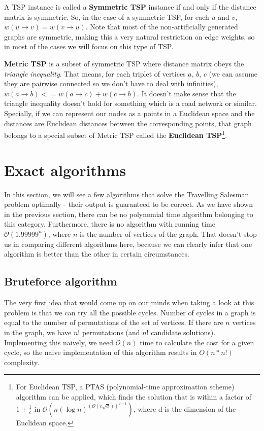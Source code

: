 \documentclass[12pt,twoside,notitlepage]{report}
\begin{document}
\smallskip

A TSP instance is called a {\bf Symmetric TSP} instance if and only if the distance matrix is symmetric. So, in the case of a symmetric TSP, for each $u$ and $v$, $w(u \rightarrow v) = w(v \rightarrow u)$. Note that most of the non-artificially generated graphs are symmetric, making this a very natural restriction on edge weights, so in most of the cases we will focus on this type of TSP. 

{\bf Metric TSP} is a subset of symmetric TSP where distance matrix obeys the {\it triangle inequality}. That means, for each triplet of vertices $a$, $b$, $c$ (we can assume they are pairwise connected so we don't have to deal with infinities), $w(a \rightarrow b) <= w(a \rightarrow c) + w(c \rightarrow b)$. It doesn't make sense that the triangle inequality doesn't hold for something which is a road network or similar. Specially, if we can represent our nodes as a points in a Euclidean space and the distances are Euclidean distances between the corresponding points, that graph belongs to a special subset of Metric TSP called the {\bf Euclidean TSP}\footnote{For Euclidean TSP, a PTAS (polynomial-time approximation scheme) algorithm can be applied, which finds the solution that is within a factor of $1 + \frac{1}{c}$ in $\mathcal{O}(n(\log n)^{(\mathcal{O}(c \sqrt{d}))^{d - 1}})$, where d is the dimension of the Euclidean space.}. %

\section{Exact algorithms}

In this section, we will see a few algorithms that solve the Travelling Salesman problem optimally - their output is guaranteed to be correct. As we have shown in the previous section, there can be no polynomial time algorithm belonging to this category. Furthermore, there is no algorithm with running time $\mathcal{O}(1.99999^{n})$, where $n$ is the number of vertices of the graph. That doesn't stop us in comparing different algorithms here, because we can clearly infer that one algorithm is better than the other in certain circumstances.

\subsection{Bruteforce algorithm}

The very first idea that would come up on our minds when taking a look at this problem is that we can try all the possible cycles. Number of cycles in a graph is equal to the number of permutations of the set of vertices. If there are $n$ vertices in the graph, we have $n!$ permutations (and $n!$ candidate solutions). Implementing this naively, we need $\mathcal{O}(n)$ time to calculate the cost for a given cycle, so the naive implementation of this algorithm results in $O(n * n!)$ complexity.
\end{document}
